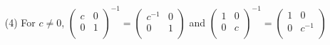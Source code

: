 \begin{example}
\begin{enumerate}
        \item[(4)] For $c \neq 0$, $\begin{pmatrix}
                    c & 0 \\
                    0 & 1 \\
            \end{pmatrix}^{-1}=
            \begin{pmatrix}
                     c^{-1} & 0 \\
                         0 & 1 \\
            \end{pmatrix}$ and
            $\begin{pmatrix}
                    1 & 0 \\
                    0 & c \\
            \end{pmatrix}^{-1}=
            \begin{pmatrix}
                     1 & 0 \\
                     0 & c^{-1} \\
            \end{pmatrix}$
    \end{enumerate}
\end{example}

